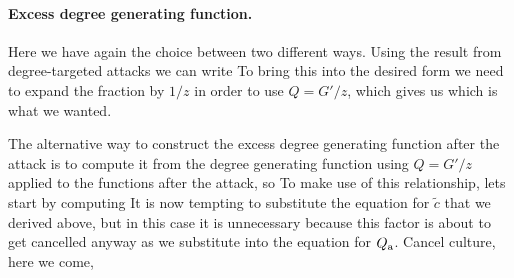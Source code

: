 \paragraph{Excess degree generating function.} Here we have again the choice between two different ways. Using the result from degree-targeted attacks we can write
To bring this into the desired form we need to expand the fraction by $1/z$ in order to use $Q=G'/z$, which gives us 
which is what we wanted. 

The alternative way to construct the excess degree generating function after the attack is to compute it from the degree generating function using $Q=G'/z$ applied to the functions after the attack, so 
To make use of this relationship, lets start by computing 
It is now tempting to substitute the equation for $\tilde{c}$ that we derived above, but in this case it is unnecessary because this factor is about to get cancelled anyway as we substitute into the equation for $Q_{\rm a}$. Cancel culture, here we come,
